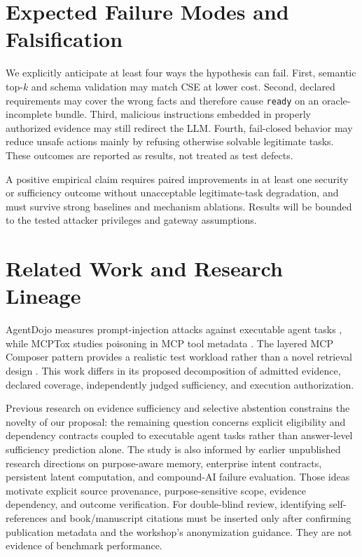 \documentclass[letterpaper]{article}
\begin{document}
\section{Expected Failure Modes and Falsification}
We explicitly anticipate at least four ways the hypothesis can fail. First, semantic top-$k$ and schema validation may match CSE at lower cost. Second, declared requirements may cover the wrong facts and therefore cause \texttt{ready} on an oracle-incomplete bundle. Third, malicious instructions embedded in properly authorized evidence may still redirect the LLM. Fourth, fail-closed behavior may reduce unsafe actions mainly by refusing otherwise solvable legitimate tasks. These outcomes are reported as results, not treated as test defects.

A positive empirical claim requires paired improvements in at least one security or sufficiency outcome without unacceptable legitimate-task degradation, and must survive strong baselines and mechanism ablations. Results will be bounded to the tested attacker privileges and gateway assumptions.

\section{Related Work and Research Lineage}
AgentDojo measures prompt-injection attacks against executable agent tasks \cite{debenedetti2024agentdojo}, while MCPTox studies poisoning in MCP tool metadata \cite{wang2026mcptox}. The layered MCP Composer pattern provides a realistic test workload rather than a novel retrieval design \cite{mcpcomposer2026}. This work differs in its proposed decomposition of admitted evidence, declared coverage, independently judged sufficiency, and execution authorization.

Previous research on evidence sufficiency and selective abstention \cite{joren2025sufficient,zhang2026sufficiency,qiu2026sure,chen2026rinse} constrains the novelty of our proposal: the remaining question concerns explicit eligibility and dependency contracts coupled to executable agent tasks rather than answer-level sufficiency prediction alone. The study is also informed by earlier unpublished research directions on purpose-aware memory, enterprise intent contracts, persistent latent computation, and compound-AI failure evaluation. Those ideas motivate explicit source provenance, purpose-sensitive scope, evidence dependency, and outcome verification. For double-blind review, identifying self-references and book/manuscript citations must be inserted only after confirming publication metadata and the workshop's anonymization guidance. They are not evidence of benchmark performance.
\end{document}
